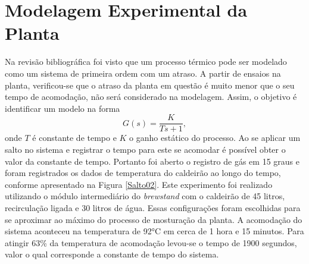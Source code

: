 		\section{Modelagem Experimental da Planta}
Na revisão bibliográfica foi visto que um processo térmico pode ser modelado como um sistema de primeira ordem com um atraso. A partir de ensaios na planta, verificou-se que o atraso da planta em questão é muito menor que o seu tempo de acomodação, não será considerado na modelagem. Assim, o objetivo é identificar um modelo na forma
\begin{equation}
	\label{eq:7}
	G(s)=\frac{K}{Ts+1},
\end{equation}
onde $T$ é constante de tempo e $K$ o ganho estático do processo. Ao se aplicar um salto no sistema e registrar o tempo para este se acomodar é possível obter o valor da constante de tempo. Portanto foi aberto o registro de gás em 15 graus e foram registrados os dados de temperatura do caldeirão ao longo do tempo, conforme apresentado na Figura \ref{Salto02}. Este experimento foi realizado utilizando o módulo intermediário do \textit{brewstand} com o caldeirão de 45 litros, recirculação ligada e 30 litros de água. Essas configurações foram escolhidas para se aproximar ao máximo do processo de mosturação da planta. A acomodação do sistema aconteceu na temperatura de 92°C em cerca de 1 hora e 15 minutos. Para atingir 63\% da temperatura de acomodação levou-se o tempo de 1900 segundos, valor o qual corresponde a constante de tempo do sistema.
 

